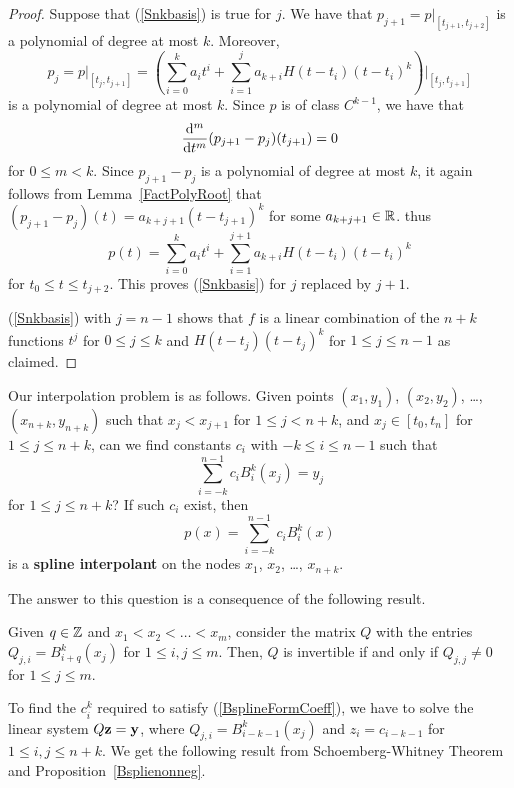 \begin{proof}
Suppose that (\ref{Snkbasis}) is true for $j$.
We have that $p_{j+1} = p\big|_{[t_{j+1},t_{j+2}]}$ is a polynomial
of degree at most $k$.  Moreover,
\[
p_j = p\big|_{[t_j,t_{j+1}]} = \left( \sum_{i=0}^k a_i t^i
+ \sum_{i=1}^j a_{k+i}H(t-t_i)(t-t_i)^k\right)\bigg|_{[t_j,t_{j+1}]}
\]
is a polynomial of degree at most $k$.  Since $p$ is of class
$C^{k-1}$, we have that
\[
  \dfdxn{(p_{j+1} - p_j)}{t}{m}(t_{j+1}) = 0
\]
for $0 \leq m < k$.  Since $p_{j+1}-p_j$ is a polynomial of degree at
most $k$, it again follows from
Lemma~\ref{FactPolyRoot} that
$(p_{j+1}-p_j)(t) = a_{k+j+1} (t- t_{j+1})^k$ for some $a_{k+j+1} \in \RR$.
thus
\[
  p(t) =  \sum_{i=0}^k a_i t^i + \sum_{i=1}^{j+1} a_{k+i}H(t-t_i)(t-t_i)^k
\]
for $t_0 \leq t \leq t_{j+2}$.  This proves (\ref{Snkbasis}) for $j$
replaced by $j+1$.

(\ref{Snkbasis}) with $j=n-1$ shows that $f$ is a linear combination
of the $n+k$ functions $t^j$ for $0\leq j \leq k$ and
$H(t-t_j)(t-t_j)^k$ for $1\leq j \leq n-1$ as claimed.
\end{proof}

Our interpolation problem is as follows.   Given points
$(x_1,y_1)$, $(x_2,y_2)$, \ldots, $(x_{n+k},y_{n+k})$
such that $\displaystyle x_j < x_{j+1}$ for $1\leq j < n+k$, and
$ x_j \in[t_0,t_n]$ for $1\leq j \leq n+k$,
can we find constants $c_i$ with $-k \leq i \leq n-1$ such that
\begin{equation}\label{BsplineFormCoeff}
\sum_{i=-k}^{n-1} c_i B_i^k(x_j) = y_j
\end{equation}
for $1\leq j \leq n+ k$?   If such $c_i$ exist, then
\begin{equation}\label{BsplineForm}
p(x) = \sum_{i=-k}^{n-1} c_i B_i^k(x)
\end{equation}
is a
{\bfseries spline interpolant} on
the nodes $x_1$, $x_2$, \ldots, $x_{n+k}$.

The answer to this question is a consequence of the following result.

\begin{theorem}
Given $q \in \ZZ$ and $x_1 < x_2 < \ldots < x_m$, consider the
 matrix $Q$ with the entries $Q_{j,i} = B_{i+q}^k(x_j)$ for
$1 \leq i,j \leq m$.  Then, $Q$ is invertible if and only if
$Q_{j,j} \neq 0$ for $1 \leq j \leq m$.
\end{theorem}

To find the $c_i^k$ required to satisfy (\ref{BsplineFormCoeff}), we
have to solve the linear system $Q \VEC{z} = \VEC{y}$, where
$Q_{j,i} = B_{i-k-1}^k(x_j)$ and $z_i = c_{i-k-1}$ 
for $1\leq i,j \leq n+k$.  We get the following result from
Schoemberg-Whitney Theorem and Proposition~\ref{Bsplienonneg}.

